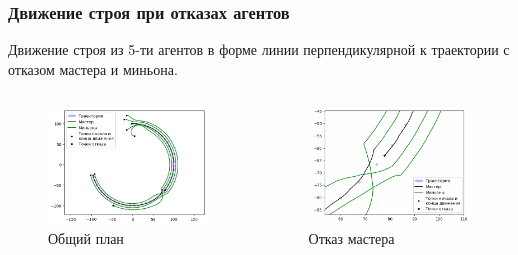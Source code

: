 \documentclass[10pt]{beamer}
\begin{document}
\begin{frame}
	\frametitle{Движение строя при отказах агентов}
	Движение строя из 5-ти агентов в форме линии перпендикулярной к траектории с отказом мастера и миньона.
	\begin{columns}
		\begin{figure}
			\centering
			\includegraphics[width=1\linewidth]{platoon/with-crashes}
			\caption{Общий план}
			\label{fig:with-crashes}
		\end{figure}
		\begin{figure}
			\centering
			\includegraphics[width=1\linewidth]{platoon/with-crashes-zoom3}
			\caption{Отказ мастера}
			\label{fig:with-crashes-zoom3}
		\end{figure}
	\end{columns}
\end{frame}
\end{document}
